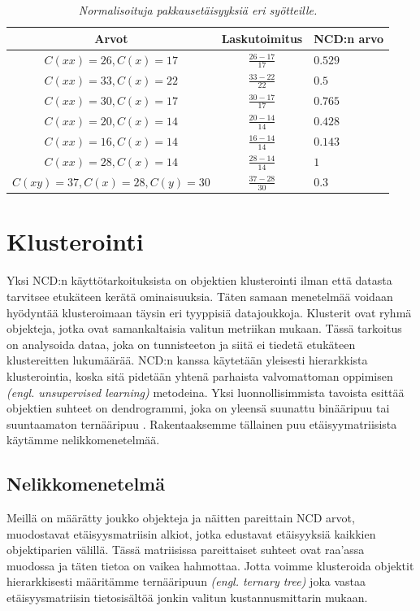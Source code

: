 \documentclass[12pt,finnish]{tktltiki2}
\theoremstyle{definition}
\theoremstyle{remark}
\newcommand{\engl}[1]{\emph{(engl. #1)}}
\begin{document}
  \begin{table}[t]
    \begin{tabular}{c|c|l}
      Arvot                    & Laskutoimitus      & NCD:n arvo        \\ \hline
      $ C(xx) = 26, C(x) = 17$ & $\frac{26-17}{17} $ & $0.529$          \\ \hline
      $ C(xx) = 33, C(x) = 22$ & $\frac{33-22}{22} $ & $0.5$            \\ \hline
      $ C(xx) = 30, C(x) = 17$ & $\frac{30-17}{17} $ & $0.765$          \\ \hline
      $ C(xx) = 20, C(x) = 14$ & $\frac{20-14}{14} $ & $0.428$          \\ \hline
      $ C(xx) = 16, C(x) = 14$ & $\frac{16-14}{14} $ & $0.143$          \\ \hline
      $ C(xx) = 28, C(x) = 14$ & $\frac{28-14}{14} $ & $1$              \\ \hline
      $ C(xy) = 37, C(x) = 28, C(y) = 30$ & $\frac{37-28}{30} $ & $0.3$ \\
    \end{tabular}
    \caption{\emph{Normalisoituja pakkausetäisyyksiä eri syötteille.}}
    \label{tab:NCD-values}
  \end{table}


\section{Klusterointi} %
\label{sec:klusterointi}

  Yksi NCD:n käyttötarkoituksista on objektien klusterointi ilman että datasta tarvitsee etukäteen kerätä ominaisuuksia.
  Täten samaan menetelmää voidaan hyödyntää klusteroimaan täysin eri tyyppisiä datajoukkoja.
  Klusterit ovat ryhmä objekteja, jotka ovat samankaltaisia valitun metriikan mukaan.
  Tässä tarkoitus on analysoida dataa, joka on tunnisteeton ja siitä ei tiedetä etukäteen klustereitten lukumäärää.
  NCD:n kanssa käytetään yleisesti hierarkkista klusterointia, koska sitä pidetään yhtenä parhaista valvomattoman oppimisen \engl{unsupervised learning} metodeina.
  Yksi luonnollisimmista tavoista esittää objektien suhteet on dendrogrammi, joka on yleensä suunattu binääripuu tai suuntaamaton ternääripuu \cite{10.1109/WDM.2004.1358107}.
  Rakentaaksemme tällainen puu etäisyymatriisista käytämme nelikkomenetelmää.

  \subsection{Nelikkomenetelmä} %
  \label{sub:nelikkomenetelma}
    Meillä on määrätty joukko objekteja ja näitten pareittain NCD arvot, muodostavat etäisyysmatriisin alkiot, jotka edustavat etäisyyksiä kaikkien objektiparien välillä.
    Tässä matriisissa pareittaiset suhteet ovat raa'assa muodossa ja täten tietoa on vaikea hahmottaa.
    Jotta voimme klusteroida objektit hierarkkisesti määritämme ternääripuun \engl{ternary tree} joka vastaa etäisyysmatriisin tietosisältöä jonkin valitun kustannusmittarin mukaan.
\end{document}
